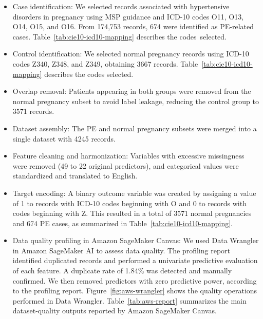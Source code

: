 \documentclass[diagnostics,article,accept,pdftex,moreauthors]{Definitions/mdpi}
\begin{document}
\begin{itemize}
\item {Case identification:} %
 We selected records associated with
  hypertensive disorders in pregnancy using \ac{MSP} guidance and
  \ac{ICD-10} codes O11, O13, O14, O15, and O16. From
  {174,753} records, {674} were identified as
  \ac{PE}-related cases. Table~\ref{tab:cie10-icd10-mapping}
  describes the \mbox{codes selected.}

\item Control identification: We selected normal pregnancy
  records using \ac{ICD-10} codes Z340, Z348, and Z349, obtaining
  {3667} records. Table~\ref{tab:cie10-icd10-mapping}
  describes the codes selected.

\item Overlap removal: Patients appearing in both groups were
  removed from the normal pregnancy subset to avoid label leakage,
  reducing the control group to {3571} records.

\item Dataset assembly: The \ac{PE} and normal pregnancy
  subsets were merged into a single dataset with {4245}
  records.

\item Feature cleaning and harmonization: Variables with
  excessive missingness were removed (49 to 22 original predictors),
  and categorical values were standardized and translated to English.

\item Target encoding: A binary outcome variable was created
  by assigning a value of 1 to records with \ac{ICD-10} codes
  beginning with O and 0 to records with codes beginning with
  {Z.} %
 This resulted in a total of {3571} normal
  pregnancies and {674} \ac{PE} cases, as summarized in
  Table~\ref{tab:cie10-icd10-mapping}.

\item Data quality profiling in Amazon SageMaker Canvas: We used
  Data Wrangler in Amazon SageMaker AI to assess data quality. The profiling
  report identified duplicated records and performed a univariate
  predictive evaluation of each feature. A duplicate rate of 1.84\%
  was detected and manually confirmed. We then removed predictors with
  zero predictive power, according to the profiling report.
  Figure~\ref{fig:aws-wrangler} shows the quality operations performed
  in Data Wrangler. Table~\ref{tab:aws-report} summarizes the main
  dataset-quality outputs reported by Amazon SageMaker Canvas.


\end{itemize}
\end{document}
